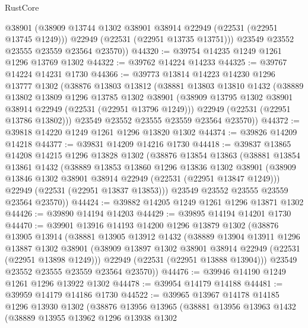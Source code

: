 \begin{lexlean}{RustCore}
\begin{coremodule}
          @38901
          (@38909 @13744 @1302 @38901 @38914 @22949 (@22531 (@22951 @13745 @1249)))
          @22949
          (@22531 (@22951 @13735 @13751)))
        @23549
        @23552
        @23555
        @23559
        @23564
        @23570))
@44320 := @39754 @14235 @1249 @1261 @1296 @13769 @1302
@44322 := @39762 @14224 @14233
@44325 := @39767 @14224 @14231 @1730
@44366 := @39773
    @13814
    @14223
    @14230
    @1296
    @13777
    @1302
    (@38876
      @13803
      @13812
      (@38881
        @13803
        @13810
        @1432
        (@38889
          @13802
          @13809
          @1296
          @13785
          @1302
          @38901
          (@38909 @13795 @1302 @38901 @38914 @22949 (@22531 (@22951 @13796 @1249)))
          @22949
          (@22531 (@22951 @13786 @13802)))
        @23549
        @23552
        @23555
        @23559
        @23564
        @23570))
@44372 := @39818 @14220 @1249 @1261 @1296 @13820 @1302
@44374 := @39826 @14209 @14218
@44377 := @39831 @14209 @14216 @1730
@44418 := @39837
    @13865
    @14208
    @14215
    @1296
    @13828
    @1302
    (@38876
      @13854
      @13863
      (@38881
        @13854
        @13861
        @1432
        (@38889
          @13853
          @13860
          @1296
          @13836
          @1302
          @38901
          (@38909 @13846 @1302 @38901 @38914 @22949 (@22531 (@22951 @13847 @1249)))
          @22949
          (@22531 (@22951 @13837 @13853)))
        @23549
        @23552
        @23555
        @23559
        @23564
        @23570))
@44424 := @39882 @14205 @1249 @1261 @1296 @13871 @1302
@44426 := @39890 @14194 @14203
@44429 := @39895 @14194 @14201 @1730
@44470 := @39901
    @13916
    @14193
    @14200
    @1296
    @13879
    @1302
    (@38876
      @13905
      @13914
      (@38881
        @13905
        @13912
        @1432
        (@38889
          @13904
          @13911
          @1296
          @13887
          @1302
          @38901
          (@38909 @13897 @1302 @38901 @38914 @22949 (@22531 (@22951 @13898 @1249)))
          @22949
          (@22531 (@22951 @13888 @13904)))
        @23549
        @23552
        @23555
        @23559
        @23564
        @23570))
@44476 := @39946 @14190 @1249 @1261 @1296 @13922 @1302
@44478 := @39954 @14179 @14188
@44481 := @39959 @14179 @14186 @1730
@44522 := @39965
    @13967
    @14178
    @14185
    @1296
    @13930
    @1302
    (@38876
      @13956
      @13965
      (@38881
        @13956
        @13963
        @1432
        (@38889
          @13955
          @13962
          @1296
          @13938
          @1302

\end{coremodule}
\end{lexlean}
